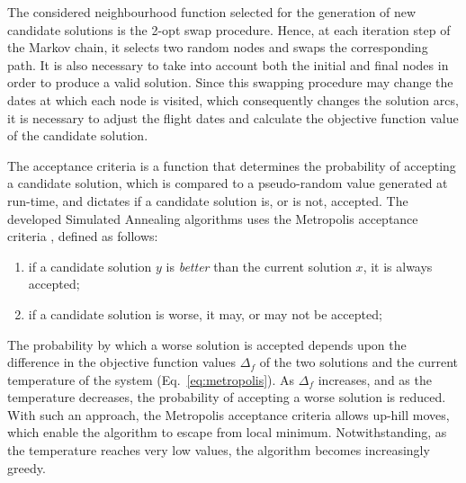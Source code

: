 The considered neighbourhood function selected for the generation of new candidate solutions is the 2-opt swap procedure. Hence, at each iteration step of the Markov chain, it selects two random nodes and swaps the corresponding path. It is also necessary to take into account both the initial and final nodes in order to produce a valid solution. Since this swapping procedure may change the dates at which each node is visited, which consequently changes the solution arcs, it is necessary to adjust the flight dates and calculate the objective function value of the candidate solution.


The acceptance criteria is a function that determines the probability of accepting a candidate solution, which is compared to a pseudo-random value generated at run-time, and dictates if a candidate solution is, or is not, accepted. The developed Simulated Annealing algorithms uses the Metropolis acceptance criteria \cite{metropolis}, defined as follows: 
\begin{enumerate}
    \item if a candidate solution $y$ is \textit{better} than the current solution $x$, it is always accepted;
    \item if a candidate solution is worse, it may, or may not be accepted;
    
\end{enumerate}

The probability by which a worse solution is accepted depends upon the difference in the objective function values $\Delta_f$ of the two solutions and the current temperature of the system (Eq.~\ref{eq:metropolis}). As $\Delta_f$ increases, and as the temperature decreases, the probability of accepting a worse solution is reduced. With such an approach, the Metropolis acceptance criteria allows up-hill moves, which enable the algorithm to escape from local minimum. Notwithstanding, as the temperature reaches very low values, the algorithm becomes increasingly greedy.

